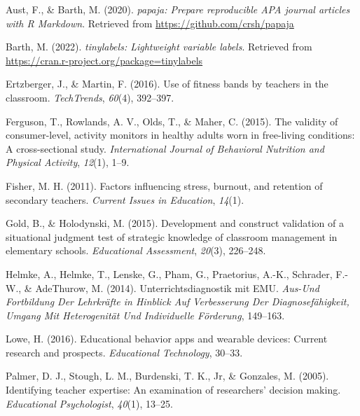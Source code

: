 \documentclass[
  man]{apa6}
\newlength{\cslhangindent}
\newlength{\cslentryspacingunit} %
\newenvironment{CSLReferences}[2] %
 {%
  \setlength{\parindent}{0pt}
  \ifodd #1
  \let\oldpar\par
  \def\par{\hangindent=\cslhangindent\oldpar}
  \fi
  \setlength{\parskip}{#2\cslentryspacingunit}
 }%
 {}
\begin{document}
\hypertarget{refs}{}
\begin{CSLReferences}{1}{0}
\leavevmode{}%
Aust, F., \& Barth, M. (2020). \emph{{papaja}: {Prepare} reproducible {APA} journal articles with {R Markdown}}. Retrieved from \url{https://github.com/crsh/papaja}

\leavevmode{}%
Barth, M. (2022). \emph{{tinylabels}: Lightweight variable labels}. Retrieved from \url{https://cran.r-project.org/package=tinylabels}

\leavevmode{}%
Ertzberger, J., \& Martin, F. (2016). Use of fitness bands by teachers in the classroom. \emph{TechTrends}, \emph{60}(4), 392--397.

\leavevmode{}%
Ferguson, T., Rowlands, A. V., Olds, T., \& Maher, C. (2015). The validity of consumer-level, activity monitors in healthy adults worn in free-living conditions: A cross-sectional study. \emph{International Journal of Behavioral Nutrition and Physical Activity}, \emph{12}(1), 1--9.

\leavevmode{}%
Fisher, M. H. (2011). Factors influencing stress, burnout, and retention of secondary teachers. \emph{Current Issues in Education}, \emph{14}(1).

\leavevmode{}%
Gold, B., \& Holodynski, M. (2015). Development and construct validation of a situational judgment test of strategic knowledge of classroom management in elementary schools. \emph{Educational Assessment}, \emph{20}(3), 226--248.

\leavevmode{}%
Helmke, A., Helmke, T., Lenske, G., Pham, G., Praetorius, A.-K., Schrader, F.-W., \& AdeThurow, M. (2014). Unterrichtsdiagnostik mit EMU. \emph{Aus-Und Fortbildung Der Lehrkr{ä}fte in Hinblick Auf Verbesserung Der Diagnosef{ä}higkeit, Umgang Mit Heterogenit{ä}t Und Individuelle F{ö}rderung}, 149--163.

\leavevmode{}%
Lowe, H. (2016). Educational behavior apps and wearable devices: Current research and prospects. \emph{Educational Technology}, 30--33.

\leavevmode{}%
Palmer, D. J., Stough, L. M., Burdenski, T. K., Jr, \& Gonzales, M. (2005). Identifying teacher expertise: An examination of researchers' decision making. \emph{Educational Psychologist}, \emph{40}(1), 13--25.


\end{CSLReferences}
\end{document}
